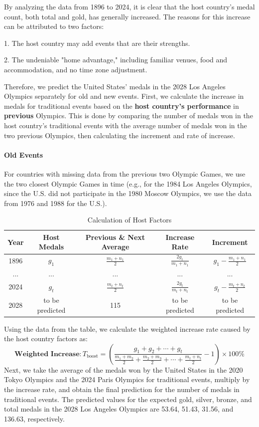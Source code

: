 \documentclass{mcmthesis}  %
\begin{document}
By analyzing the data from 1896 to 2024, it is clear that the host country's medal count, both total and gold, has generally increased. The reasons for this increase can be attributed to two factors:

1. The host country may add events that are their strengths.

2. The undeniable "home advantage," including familiar venues, food and accommodation, and no time zone adjustment.

Therefore, we predict the United States' medals in the 2028 Los Angeles Olympics separately for old and new events. First, we calculate the increase in medals for traditional events based on the \textbf{host country's performance} in \textbf{previous} Olympics. This is done by comparing the number of medals won in the host country’s traditional events with the average number of medals won in the two previous Olympics, then calculating the increment and rate of increase.

\paragraph{Old Events}
For countries with missing data from the previous two Olympic Games, we use the two closest Olympic Games in time (e.g., for the 1984 Los Angeles Olympics, since the U.S. did not participate in the 1980 Moscow Olympics, we use the data from 1976 and 1988 for the U.S.).

\begin{table}[ht]
\centering
\begin{tabular}{|c|c|c|c|c|}
\hline
\textbf{Year} & \textbf{Host Medals} & \textbf{ Previous \& Next Average} & \textbf{Increase Rate} & \textbf{Increment} \\ \hline
1896 & $g_1$ & $\frac{m_1 + n_1}{2}$ & $\frac{2g_1}{m_1+n_1}$ & $g_1 - \frac{m_1 + n_1}{2}$ \\ \hline
... & ... & ... & ... & ... \\ \hline
2024 & $g_t$ & $\frac{m_t + n_t}{2}$ & $\frac{2g_t}{m_t+n_t}$ & $g_t - \frac{m_t + n_t}{2}$ \\ \hline
2028 & to be predicted& 115& to be predicted& to be predicted\\ \hline
\end{tabular}
\caption{Calculation of Host Factors}
\end{table}

Using the data from the table, we calculate the weighted increase rate caused by the host country factors as:
\[
\textbf{Weighted Increase}: T_{\text{boost}} = \left( \frac{g_1 + g_2 + \cdots + g_t}{\frac{m_1 + m_2}{2} + \frac{m_2 + m_3}{2} + \cdots + \frac{m_t + n_t}{2}} - 1 \right) \times 100\%
\]
Next, we take the average of the medals won by the United States in the 2020 Tokyo Olympics and the 2024 Paris Olympics for traditional events, multiply by the increase rate, and obtain the final prediction for the number of medals in traditional events. The predicted values for the expected gold, silver, bronze, and total medals in the 2028 Los Angeles Olympics are 53.64, 51.43, 31.56, and 136.63, respectively.
\end{document}
